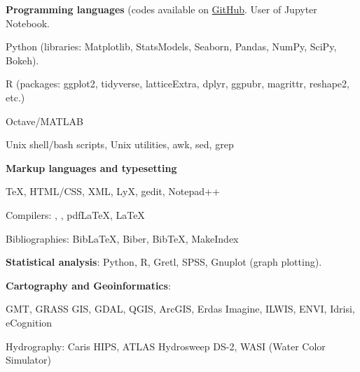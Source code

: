 \documentclass[10pt]{article}
\newenvironment{innerlist}[1][\enskip\textbullet]%
        {\begin{compactitem}[#1]}{\end{compactitem}}
\begin{document}
\begin{innerlist}

\item[\faCode\space] \textbf{Programming languages} (codes available on \href{https://github.com/paulinelemenkova}{GitHub}. User of Jupyter Notebook.
	\begin{innerlist}
		\item Python (libraries: Matplotlib, StatsModels, Seaborn, Pandas, NumPy, SciPy, Bokeh). 
		\item R (packages: ggplot2, tidyverse, latticeExtra, dplyr, ggpubr, magrittr, reshape2, etc.)
		\item Octave/MATLAB
		\item Unix shell/bash scripts, Unix utilities, awk, sed, grep
	\end{innerlist}
\vspace{1ex}

\item[\faPencil\space] \textbf{Markup languages and typesetting}
\begin{innerlist}
	\item \TeX, HTML/CSS, XML, LyX, gedit, Notepad++
	\item Compilers: \LuaLaTeX, \XeLaTeX, pdf\LaTeX, \LaTeX
	\item Bibliographies: Bib\LaTeX, Biber, Bib\TeX, MakeIndex
\end{innerlist}
	
\item[\faLineChart\space] \textbf{Statistical analysis}: Python, R, Gretl, SPSS, Gnuplot (graph plotting).
	
\item[\faEye\space] \textbf{Cartography and Geoinformatics}: 
\begin{innerlist}
	\item GMT, GRASS GIS, GDAL, QGIS, ArcGIS, Erdas Imagine, ILWIS, ENVI, Idrisi, eCognition
	\item Hydrography: Caris HIPS, ATLAS Hydrosweep DS-2, WASI (Water Color Simulator)
\end{innerlist}


\end{innerlist}
\end{document}
